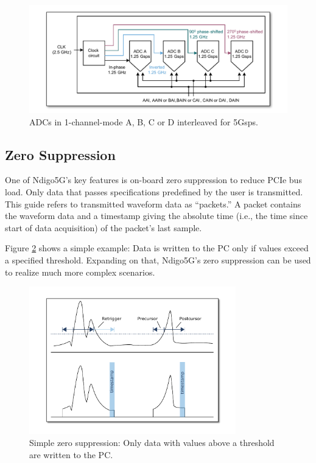 \begin{figure}
    \centering
    \includegraphics[width=\textwidth]{figures/1ChannelMode.pdf}
    \caption{ADCs in 1-channel-mode A, B, C or D interleaved for 5Gsps.\label{fig:1ChannelMode}}
\end{figure}

\clearpage
\subsection{Zero Suppression}

One of Ndigo5G's key features is on-board zero suppression to reduce PCIe bus load. Only data that passes specifications predefined by the user is transmitted. This guide refers to transmitted waveform data as ``packets.'' A packet contains the waveform data and a timestamp giving the absolute time (i.e., the time since start of data acquisition) of the packet's last sample.\par Figure \ref{fig:ZeroSupp} shows a simple example: Data is written to the PC only if values exceed a specified threshold. Expanding on that, Ndigo5G's zero suppression can be used to realize much more complex scenarios.

\begin{figure}[hb]
    \centering
    \includegraphics[width=0.8\textwidth]{figures/ZeroSupp.pdf}
    \caption{Simple zero suppression: Only data with values above a threshold are written to the PC.\label{fig:ZeroSupp}}
\end{figure}

